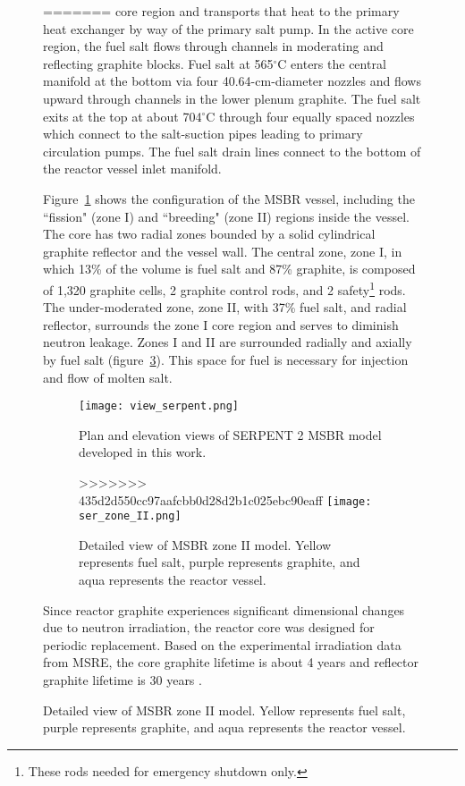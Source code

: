 \begin{figure}[t!] %
  \centering
=======
core region and transports that heat to the primary heat exchanger by way of 
the primary salt pump. In the active core region, the fuel salt flows through 
channels in moderating and reflecting graphite blocks. Fuel salt at
565$^{\circ}$C enters the central manifold at the bottom via four 
40.64-cm-diameter nozzles and flows upward through channels in the lower plenum 
graphite. The fuel salt exits at the top at about 704$^{\circ}$C through four 
equally spaced nozzles which connect to the salt-suction pipes leading to 
primary circulation pumps. The fuel salt drain lines connect to the bottom of 
the reactor vessel inlet manifold.

Figure~\ref{fig:serpent_plan_view} shows the configuration of the 
\gls{MSBR} vessel, including the ``fission" (zone I) and ``breeding" 
(zone II) regions inside the vessel. The core has two radial zones bounded by a 
solid cylindrical graphite reflector and the vessel wall. The central zone, 
zone I, in which 13\% of the volume is fuel salt and 87\% graphite, is
composed of 1,320 graphite cells, 2 graphite control rods, and 2 
safety\footnote{ These rods needed for emergency shutdown only.} rods. The 
under-moderated zone, zone II, with 37\% fuel salt, and radial reflector, 
surrounds the zone I core region and serves to diminish neutron leakage. Zones 
I and II are surrounded radially and axially by fuel salt 
(figure~\ref{fig:serpent_zoneII}). This space for fuel is necessary for 
injection and flow of molten salt.

\begin{figure}[hbp!] %
  \texttt{[image: view\_serpent.png]}
  \caption{Plan and elevation views of SERPENT 2 \gls{MSBR} model developed in 
  this work.}
  \label{fig:serpent_plan_view}
\end{figure}

\begin{figure}[t!] %
>>>>>>> 435d2d550cc97aafcbb0d28d2b1c025ebc90eaff
  \texttt{[image: ser\_zone\_II.png]}
  \caption{Detailed view of \gls{MSBR} zone II model.  
          Yellow represents fuel salt, purple represents graphite, and aqua represents the reactor vessel.}
  \label{fig:serpent_zoneII}
\end{figure}

Since reactor graphite experiences significant dimensional changes due to 
neutron irradiation, the reactor core was designed for periodic replacement. 
Based on the experimental irradiation data from \gls{MSRE}, the core graphite 
lifetime is about 4 years and reflector graphite lifetime is 30 years 
\cite{robertson_conceptual_1971}.


\end{figure}
